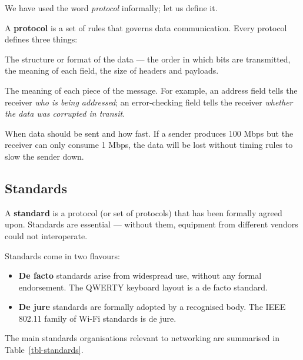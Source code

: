 \documentclass[
  letterpaper,
  DIV=11,
  numbers=noendperiod]{scrreprt}
\providecommand{\tightlist}{%
  \setlength{\itemsep}{0pt}\setlength{\parskip}{0pt}}
\begin{document}
We have used the word \emph{protocol} informally; let us define it.

A \textbf{protocol} is a set of rules that governs data communication.
Every protocol defines three things:

\begin{description}
\tightlist
\item[Syntax]
The structure or format of the data --- the order in which bits are
transmitted, the meaning of each field, the size of headers and
payloads.
\item[Semantics]
The meaning of each piece of the message. For example, an address field
tells the receiver \emph{who is being addressed}; an error-checking
field tells the receiver \emph{whether the data was corrupted in
transit}.
\item[Timing]
When data should be sent and how fast. If a sender produces 100 Mbps but
the receiver can only consume 1 Mbps, the data will be lost without
timing rules to slow the sender down.
\end{description}

\subsection{Standards}\label{standards}

A \textbf{standard} is a protocol (or set of protocols) that has been
formally agreed upon. Standards are essential --- without them,
equipment from different vendors could not interoperate.

Standards come in two flavours:

\begin{itemize}
\tightlist
\item
  \textbf{De facto} standards arise from widespread use, without any
  formal endorsement. The QWERTY keyboard layout is a de facto standard.
\item
  \textbf{De jure} standards are formally adopted by a recognised body.
  The IEEE 802.11 family of Wi-Fi standards is de jure.
\end{itemize}

The main standards organisations relevant to networking are summarised
in Table~\ref{tbl-standards}.
\end{document}
